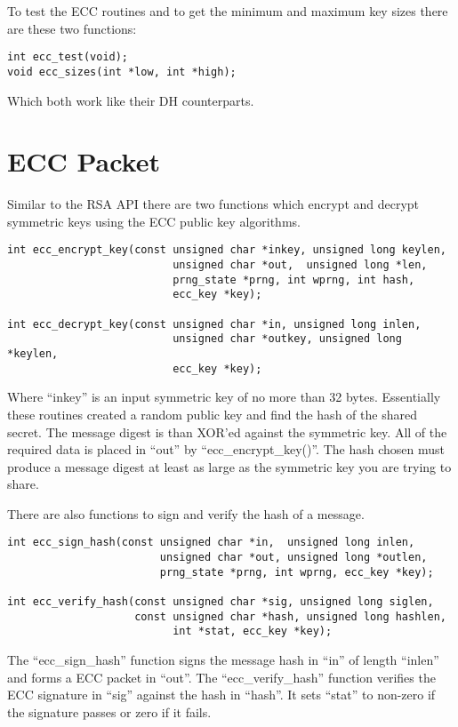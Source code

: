 \documentclass{book}
\begin{document}
To test the ECC routines and to get the minimum and maximum key sizes there are these two functions:
\begin{verbatim}
int ecc_test(void);
void ecc_sizes(int *low, int *high);
\end{verbatim}
Which both work like their DH counterparts.

\section{ECC Packet}
Similar to the RSA API there are two functions which encrypt and decrypt symmetric keys using the ECC public key
algorithms.
\begin{verbatim}
int ecc_encrypt_key(const unsigned char *inkey, unsigned long keylen,
                          unsigned char *out,  unsigned long *len, 
                          prng_state *prng, int wprng, int hash, 
                          ecc_key *key);

int ecc_decrypt_key(const unsigned char *in, unsigned long inlen,
                          unsigned char *outkey, unsigned long *keylen, 
                          ecc_key *key);
\end{verbatim}

Where ``inkey'' is an input symmetric key of no more than 32 bytes.  Essentially these routines created a random public key
and find the hash of the shared secret.  The message digest is than XOR'ed against the symmetric key.  All of the required
data is placed in ``out'' by ``ecc\_encrypt\_key()''.   The hash chosen must produce a message digest at least as large
as the symmetric key you are trying to share.

There are also functions to sign and verify the hash of a message.
\begin{verbatim}
int ecc_sign_hash(const unsigned char *in,  unsigned long inlen,
                        unsigned char *out, unsigned long *outlen,
                        prng_state *prng, int wprng, ecc_key *key);

int ecc_verify_hash(const unsigned char *sig, unsigned long siglen,
                    const unsigned char *hash, unsigned long hashlen, 
                          int *stat, ecc_key *key);
\end{verbatim}

The ``ecc\_sign\_hash'' function signs the message hash in ``in'' of length ``inlen'' and forms a ECC packet in ``out''.  
The ``ecc\_verify\_hash'' function verifies the ECC signature in ``sig'' against the hash in ``hash''.  It sets ``stat''
to non-zero if the signature passes or zero if it fails.
\end{document}
